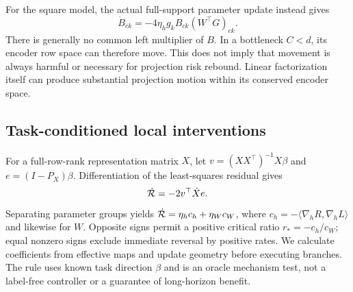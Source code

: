 For the square model, the actual full-support parameter update instead gives
\begin{equation}
\dot B_{ck}=-4\eta_h g_kB_{ck}(W^\top G)_{ck}.
\label{eq:squareupdate}
\end{equation}
There is generally no common left multiplier of $B$. In a bottleneck $C<d$, its encoder row space can therefore move. This does not imply that movement is always harmful or necessary for projection risk rebound. Linear factorization itself can produce substantial projection motion within its conserved encoder space.

\subsection{Task-conditioned local interventions}
For a full-row-rank representation matrix $X$, let $v=(XX^\top)^{-1}X\beta$ and $e=(I-P_X)\beta$. Differentiation of the least-squares residual gives
\begin{equation}
\dot{\mathcal R}=-2v^\top\dot X e.
\label{eq:drisk}
\end{equation}
Separating parameter groups yields $\dot{\mathcal R}=\eta_h c_h+\eta_W c_W$, where $c_h=-\langle\nabla_h R,\nabla_h L\rangle$ and likewise for $W$. Opposite signs permit a positive critical ratio $r_*=-c_h/c_W$; equal nonzero signs exclude immediate reversal by positive rates. We calculate coefficients from effective maps and update geometry before executing branches. The rule uses known task direction $\beta$ and is an oracle mechanism test, not a label-free controller or a guarantee of long-horizon benefit.
